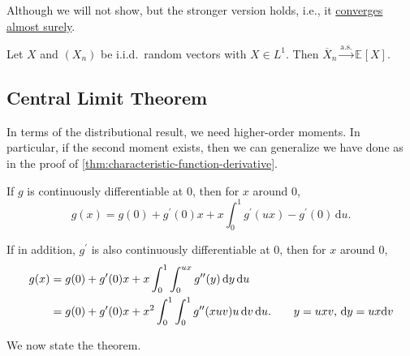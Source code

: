 Although we will not show, but the stronger version holds, i.e., it \hyperref[def:converge-almost-surely]{converges almost surely}.

\begin{theorem}\label{thm:SLLN}
	Let \(X\) and \((X_n)\) be i.i.d.\ random vectors with \(X \in L^1\). Then \(\overline{X} _n \overset{\text{a.s.} }{\to } \mathbb{E}_{}[X] \).
\end{theorem}

\subsection{Central Limit Theorem}
In terms of the distributional result, we need higher-order moments. In particular, if the second moment exists, then we can generalize we have done as in the proof of \autoref{thm:characteristic-function-derivative}.

\begin{prev}
	If \(g\) is continuously differentiable at \(0\), then for \(x\) around \(0\),
	\[
		g(x)
		= g(0) + g^{\prime} (0) x + x \int_{0}^{1} g^{\prime} (ux) - g^{\prime} (0) \,\mathrm{d}u .
	\]
\end{prev}

\begin{note}\label{note:lec10}
	If in addition, \(g^{\prime} \) is also continuously differentiable at \(0\), then for \(x\) around \(0\),
	\begin{align*}
		g(x)
		 & = g(0) + g^{\prime} (0) x + x \int_{0}^{1} \int_{0}^{ux} g^{\prime\prime} (y) \,\mathrm{d}y \,\mathrm{d} u                                                               \\
		 & = g(0) + g^{\prime} (0) x + x^2 \int_{0}^{1} \int_{0}^{1} g^{\prime\prime} (xuv) u \,\mathrm{d}v \,\mathrm{d} u. \tag*{\(y = ux v\), \(\mathrm{d} y = ux \mathrm{d} v\)} \\
	\end{align*}
\end{note}

We now state the theorem.

